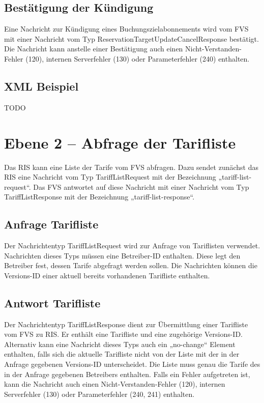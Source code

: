 

\subsection{Bestätigung der Kündigung}
Eine Nachricht zur Kündigung eines Buchungszielabonnements wird vom FVS mit einer Nachricht vom Typ ReservationTargetUpdateCancelResponse bestätigt. Die Nachricht kann anstelle einer Bestätigung auch einen Nicht-Verstanden-Fehler (120), internen Serverfehler (130) oder Parameterfehler (240) enthalten.



\subsection{XML Beispiel}
TODO

\section{Ebene 2 -- Abfrage der Tarifliste}
Das RIS kann eine Liste der Tarife vom FVS abfragen. Dazu sendet zunächst das RIS eine Nachricht vom Typ TariffListRequest mit der Bezeichnung „tariff-list-request“. Das FVS antwortet auf diese Nachricht mit einer Nachricht vom Typ TariffListResponse mit der Bezeichnung „tariff-list-response“.



\subsection{Anfrage Tarifliste}
Der Nachrichtentyp TariffListRequest wird zur Anfrage von Tariflisten verwendet. Nachrichten dieses Typs müssen eine Betreiber-ID enthalten. Diese legt den Betreiber fest, dessen Tarife abgefragt werden sollen. Die Nachrichten können die Versions-ID einer aktuell bereits vorhandenen Tarifliste enthalten.



\subsection{Antwort Tarifliste}
Der Nachrichtentyp TariffListResponse dient zur Übermittlung einer Tarifliste vom FVS zu RIS. Er enthält eine Tarifliste und eine zugehörige Versions-ID. Alternativ kann eine Nachricht dieses Typs auch ein „no-change“ Element enthalten, falls sich die aktuelle Tarifliste nicht von der Liste mit der in der Anfrage gegebenen Versions-ID  unterscheidet. Die Liste muss genau die Tarife des in der Anfrage gegebenen Betreibers enthalten. Falls ein Fehler aufgetreten ist, kann die Nachricht auch einen Nicht-Verstanden-Fehler (120), internen Serverfehler (130) oder Parameterfehler (240, 241) enthalten.

